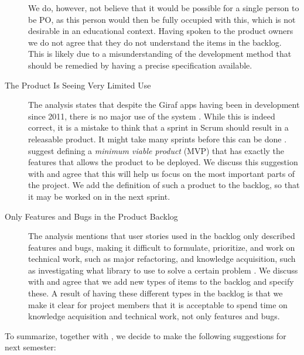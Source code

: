 \begin{description}
We do, however, not believe that it would be possible for a single person to be PO, as this person would then be fully occupied with this, which is not desirable in an educational context. Having spoken to the product owners we do not agree that they do not understand the items in the backlog. This is likely due to a misunderstanding of the development method that should be remedied by having a precise specification available.
  \item[The Product Is Seeing Very Limited Use] The analysis states that despite the Giraf apps having been in development since 2011, there is no major use of the system \cite{processanalysis}. While this is indeed correct, it is a mistake to think that a sprint in Scrum should result in a releasable product. It might take many sprints before this can be done \parencite{larman2003}.  suggest defining a \emph{minimum viable product} (MVP) that has exactly the features that allows the product to be deployed. We discuss this suggestion with  and agree that this will help us focus on the most important parts of the project. We add the definition of such a product to the backlog, so that it may be worked on in the next sprint.
  \item[Only Features and Bugs in the Product Backlog] The analysis mentions that user stories used in the backlog only described features and bugs, making it difficult to formulate, prioritize, and work on technical work, such as major refactoring, and knowledge acquisition, such as investigating what library to use to solve a certain problem \cite{processanalysis}. We discuss with  and agree that we add new types of items to the backlog and specify these. A result of having these different types in the backlog is that we make it clear for project members that it is acceptable to spend time on knowledge acquisition and technical work, not only features and bugs.
\end{description}

To summarize, together with , we decide to make the following suggestions for next semester:

